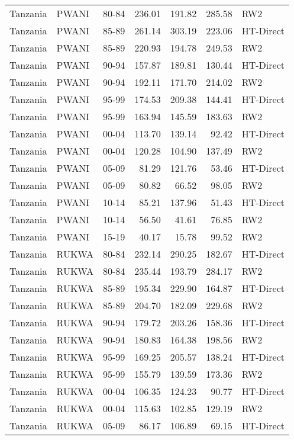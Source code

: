 \begin{longtable}{lllrrrl}
  Tanzania & PWANI & 80-84 & 236.01 & 191.82 & 285.58 & RW2 \\ 
  Tanzania & PWANI & 85-89 & 261.14 & 303.19 & 223.06 & HT-Direct \\ 
  Tanzania & PWANI & 85-89 & 220.93 & 194.78 & 249.53 & RW2 \\ 
  Tanzania & PWANI & 90-94 & 157.87 & 189.81 & 130.44 & HT-Direct \\ 
  Tanzania & PWANI & 90-94 & 192.11 & 171.70 & 214.02 & RW2 \\ 
  Tanzania & PWANI & 95-99 & 174.53 & 209.38 & 144.41 & HT-Direct \\ 
  Tanzania & PWANI & 95-99 & 163.94 & 145.59 & 183.63 & RW2 \\ 
  Tanzania & PWANI & 00-04 & 113.70 & 139.14 & 92.42 & HT-Direct \\ 
  Tanzania & PWANI & 00-04 & 120.28 & 104.90 & 137.49 & RW2 \\ 
  Tanzania & PWANI & 05-09 & 81.29 & 121.76 & 53.46 & HT-Direct \\ 
  Tanzania & PWANI & 05-09 & 80.82 & 66.52 & 98.05 & RW2 \\ 
  Tanzania & PWANI & 10-14 & 85.21 & 137.96 & 51.43 & HT-Direct \\ 
  Tanzania & PWANI & 10-14 & 56.50 & 41.61 & 76.85 & RW2 \\ 
  Tanzania & PWANI & 15-19 & 40.17 & 15.78 & 99.52 & RW2 \\ 
  Tanzania & RUKWA & 80-84 & 232.14 & 290.25 & 182.67 & HT-Direct \\ 
  Tanzania & RUKWA & 80-84 & 235.44 & 193.79 & 284.17 & RW2 \\ 
  Tanzania & RUKWA & 85-89 & 195.34 & 229.90 & 164.87 & HT-Direct \\ 
  Tanzania & RUKWA & 85-89 & 204.70 & 182.09 & 229.68 & RW2 \\ 
  Tanzania & RUKWA & 90-94 & 179.72 & 203.26 & 158.36 & HT-Direct \\ 
  Tanzania & RUKWA & 90-94 & 180.83 & 164.38 & 198.56 & RW2 \\ 
  Tanzania & RUKWA & 95-99 & 169.25 & 205.57 & 138.24 & HT-Direct \\ 
  Tanzania & RUKWA & 95-99 & 155.79 & 139.59 & 173.36 & RW2 \\ 
  Tanzania & RUKWA & 00-04 & 106.35 & 124.23 & 90.77 & HT-Direct \\ 
  Tanzania & RUKWA & 00-04 & 115.63 & 102.85 & 129.19 & RW2 \\ 
  Tanzania & RUKWA & 05-09 & 86.17 & 106.89 & 69.15 & HT-Direct \\ 

\end{longtable}
